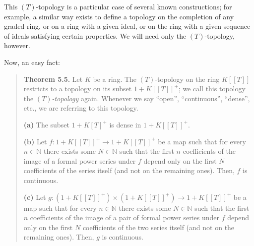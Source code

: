 \documentclass[numbers=enddot,12pt,final,onecolumn,notitlepage]{scrartcl}%
\begin{document}
This $\left(  T\right)  $-topology is a particular case of several known
constructions; for example, a similar way exists to define a topology on the
completion of any graded ring, or on a ring with a given ideal, or on the ring
with a given sequence of ideals satisfying certain properties. We will need
only the $\left(  T\right)  $-topology, however.

Now, an easy fact:

\begin{quote}
\textbf{Theorem 5.5.} Let $K$ be a ring. The $\left(  T\right)  $-topology on
the ring $K\left[  \left[  T\right]  \right]  $ restricts to a topology on its
subset $1+K\left[  \left[  T\right]  \right]  ^{+}$; we call this topology the
$\left(  T\right)  $\textit{-topology} again. Whenever we say ``open'',
``continuous'', ``dense'', etc., we are referring to this topology.

\textbf{(a)} The subset $1+K\left[  T\right]  ^{+}$ is dense in $1+K\left[
\left[  T\right]  \right]  ^{+}$.

\textbf{(b)} Let $f:1+K\left[  \left[  T\right]  \right]  ^{+}\rightarrow
1+K\left[  \left[  T\right]  \right]  ^{+}$ be a map such that for every
$n\in\mathbb{N}$ there exists some $N\in\mathbb{N}$ such that the first $n$
coefficients of the image of a formal power series under $f$ depend only on
the first $N$ coefficients of the series itself (and not on the remaining
ones). Then, $f$ is continuous.

\textbf{(c)} Let $g:\left(  1+K\left[  \left[  T\right]  \right]  ^{+}\right)
\times\left(  1+K\left[  \left[  T\right]  \right]  ^{+}\right)
\rightarrow1+K\left[  \left[  T\right]  \right]  ^{+}$ be a map such that for
every $n\in\mathbb{N}$ there exists some $N\in\mathbb{N}$ such that the first
$n$ coefficients of the image of a pair of formal power series under $f$
depend only on the first $N$ coefficients of the two series itself (and not on
the remaining ones). Then, $g$ is continuous.


\end{quote}
\end{document}

